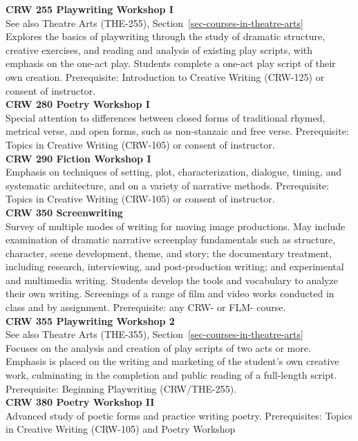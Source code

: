 \documentclass[
  letterpaper,
]{scrbook}
\begin{document}
\textbf{CRW 255 Playwriting Workshop I}\\
See also Theatre Arts (THE-255),
Section~\ref{sec-courses-in-theatre-arts}\\
Explores the basics of playwriting through the study of dramatic
structure, creative exercises, and reading and analysis of existing play
scripts, with emphasis on the one-act play. Students complete a one-act
play script of their own creation. Prerequisite: Introduction to
Creative Writing (CRW-125) or consent of instructor.\\
\textbf{CRW 280 Poetry Workshop I}\\
Special attention to differences between closed forms of traditional
rhymed, metrical verse, and open forms, such as non-stanzaic and free
verse. Prerequisite: Topics in Creative Writing (CRW-105) or consent of
instructor.\\
\textbf{CRW 290 Fiction Workshop I}\\
Emphasis on techniques of setting, plot, characterization, dialogue,
timing, and systematic architecture, and on a variety of narrative
methods. Prerequisite: Topics in Creative Writing (CRW-105) or consent
of instructor.\\
\textbf{CRW 350 Screenwriting}\\
Survey of multiple modes of writing for moving image productions. May
include examination of dramatic narrative screenplay fundamentals such
as structure, character, scene development, theme, and story; the
documentary treatment, including research, interviewing, and
post-production writing; and experimental and multimedia writing.
Students develop the tools and vocabulary to analyze their own writing.
Screenings of a range of film and video works conducted in class and by
assignment. Prerequisite: any CRW- or FLM- course.\\
\textbf{CRW 355 Playwriting Workshop 2}\\
See also Theatre Arts (THE-355),
Section~\ref{sec-courses-in-theatre-arts}\\
Focuses on the analysis and creation of play scripts of two acts or
more. Emphasis is placed on the writing and marketing of the student's
own creative work, culminating in the completion and public reading of a
full-length script. Prerequisite: Beginning Playwriting (CRW/THE-255).\\
\textbf{CRW 380 Poetry Workshop II}\\
Advanced study of poetic forms and practice writing poetry.
Prerequisites: Topics in Creative Writing (CRW-105) and Poetry Workshop
\end{document}
